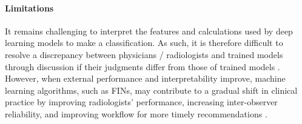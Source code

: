 \documentclass{article}
\begin{document}

\paragraph*{Limitations} \label{sec:Con} It remains challenging  to interpret the features and calculations used by deep learning models to make a classification. As such, it is therefore difficult to resolve a discrepancy between physicians / radiologists and trained models through discussion if their judgments differ from those of trained models \cite{yasaka2018deep}. However, when external performance and interpretability improve, machine learning algorithms, such as FINs, may contribute to a gradual shift in clinical practice by improving radiologists' performance, increasing inter-observer reliability, and improving workflow for more timely recommendations \cite{yasaka2018deep}.


\newpage



\end{document}
